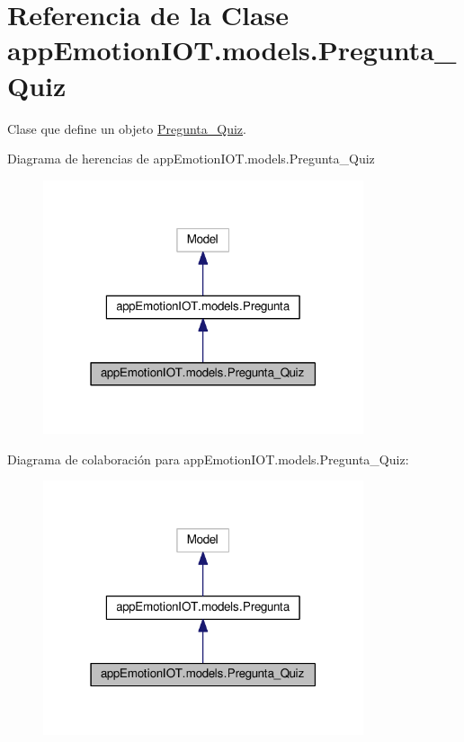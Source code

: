 \hypertarget{classappEmotionIOT_1_1models_1_1Pregunta__Quiz}{}\section{Referencia de la Clase app\+Emotion\+I\+O\+T.\+models.\+Pregunta\+\_\+\+Quiz}
\label{classappEmotionIOT_1_1models_1_1Pregunta__Quiz}


Clase que define un objeto \hyperlink{classappEmotionIOT_1_1models_1_1Pregunta__Quiz}{Pregunta\+\_\+\+Quiz}.  




Diagrama de herencias de app\+Emotion\+I\+O\+T.\+models.\+Pregunta\+\_\+\+Quiz
\nopagebreak
\begin{figure}[H]
\begin{center}
\leavevmode
\includegraphics[width=267pt]{classappEmotionIOT_1_1models_1_1Pregunta__Quiz__inherit__graph}
\end{center}
\end{figure}


Diagrama de colaboración para app\+Emotion\+I\+O\+T.\+models.\+Pregunta\+\_\+\+Quiz\+:
\nopagebreak
\begin{figure}[H]
\begin{center}
\leavevmode
\includegraphics[width=267pt]{classappEmotionIOT_1_1models_1_1Pregunta__Quiz__coll__graph}
\end{center}
\end{figure}
